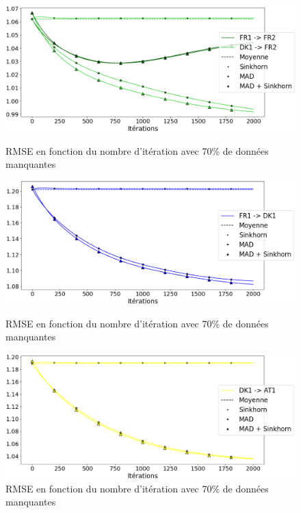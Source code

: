 \documentclass[acmsmall, natbib=false, nonacm]{acmart}
\begin{document}
\begin{figure}[H]
    \begin{minipage}[b]{0.4\linewidth}
		\centering \includegraphics[scale=0.14]{images/70_ar_FR2.png}
		\caption{RMSE en fonction du nombre d'itération avec 70\% de données manquantes}
	\end{minipage}\hfill
    \begin{minipage}[b]{0.4\linewidth}
		\centering \includegraphics[scale=0.14]{images/70_ar_DK1.png}
		\caption{RMSE en fonction du nombre d'itération avec 70\% de données manquantes}
	\end{minipage}\hfill
    \begin{minipage}[b]{0.4\linewidth}
		\centering \includegraphics[scale=0.14]{images/70_ar_AT1.png}
		\caption{RMSE en fonction du nombre d'itération avec 70\% de données manquantes}
	\end{minipage}
\end{figure}
\end{document}
